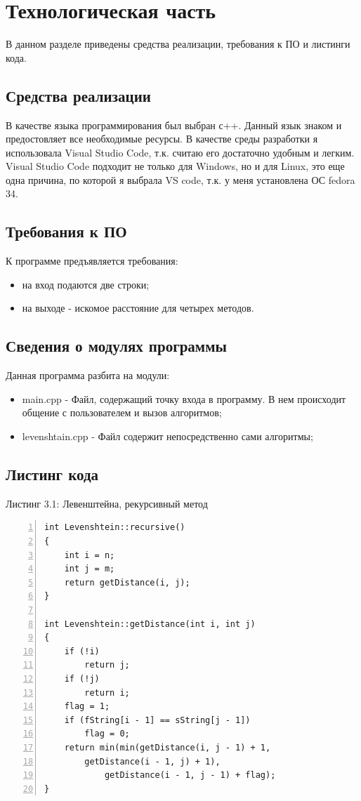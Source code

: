 \documentclass[12pt,a4paper]{report}
\begin{document}
\newpage
\chapter{Технологическая часть} 

В данном разделе приведены средства реализации, требования к ПО и листинги кода.

\section{Средства реализации}
В качестве языка программирования был выбран с++. Данный язык знаком и предостовляет все необходимые ресурсы.
В качестве среды разработки я использовала Visual Studio Code, т.к. считаю его достаточно удобным и легким.
Visual Studio Code подходит не только для  Windows, но и для Linux, это еще одна причина, по которой я выбрала VS code, т.к. у меня установлена ОС  fedora 34.

\section{Требования к ПО}

К программе предъявляется требования:

\begin{itemize}
	\item на вход подаются две строки;
	\item на выходе - искомое расстояние для четырех методов.
\end{itemize} 


\section{Сведения о модулях программы}

Данная программа разбита на модули:

\begin{itemize}
	\item main.cpp - Файл, содержащий точку входа в программу. В нем происходит общение с пользователем и вызов алгоритмов;
	\item levenshtain.cpp - Файл содержит непосредственно сами алгоритмы;
\end{itemize}

\section{Листинг кода}

\noindent\textrm{Листинг 3.1: Левенштейна, рекурсивный метод}
\begin{lstlisting}[frame=single, numbers=left]	
int Levenshtein::recursive()
{	
	int i = n;
	int j = m;
	return getDistance(i, j);
}

int Levenshtein::getDistance(int i, int j)
{
	if (!i)
		return j;
	if (!j)
		return i;
	flag = 1;
	if (fString[i - 1] == sString[j - 1])
		flag = 0;
	return min(min(getDistance(i, j - 1) + 1,
		getDistance(i - 1, j) + 1),
			getDistance(i - 1, j - 1) + flag);
}
\end{lstlisting}
\end{document}
